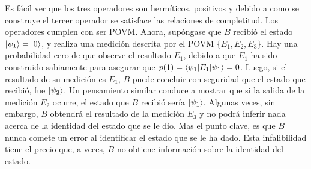 Es fácil ver que los tres operadores son hermíticos, positivos y debido a como
se construye el tercer operador se satisface las relaciones de completitud. Los
operadores cumplen con ser POVM\@. Ahora, supóngase que $B$ recibió el estado
$|\psi_1\rangle=|0\rangle$, y realiza una medición descrita por el POVM
$\{E_1,E_2,E_3\}$. Hay una probabilidad cero de que observe el resultado $E_1$,
debido a que $E_1$ ha sido construido sabiamente para asegurar que
$p(1)=\langle\psi_1|E_1|\psi_1\rangle=0$. Luego, si el resultado de su medición es
$E_1$, $B$ puede concluir con seguridad que el estado que recibió, fue
$|\psi_2\rangle $. Un pensamiento similar conduce a mostrar que si la salida de la
medición $E_2$ ocurre, el estado que $B$ recibió sería $|\psi_1\rangle$. Algunas
veces, sin embargo, $B$ obtendrá el resultado de la medición $E_3$ y no podrá
inferir nada acerca de la identidad del estado que se le dio. Mas el punto
clave, es que $B$ nunca comete un error al identificar el estado que se le ha
dado. Esta infalibilidad tiene el precio que, a veces, $B$ no obtiene
información sobre la identidad del estado.

